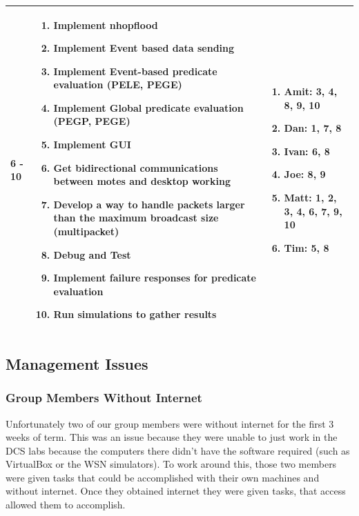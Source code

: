 \begin{center}
\begin{longtable}{| l | p{7.5cm} | p{5cm} |}
	6 - 10 & \begin{enumerate}
		\item Implement nhopflood
		\item Implement Event based data sending
		\item Implement Event-based predicate evaluation (PELE, PEGE)
		\item Implement Global predicate evaluation (PEGP, PEGE)
		\item Implement GUI
		\item Get bidirectional communications between motes and desktop working
		\item Develop a way to handle packets larger than the maximum broadcast size (multipacket)
		\item Debug and Test
		\item Implement failure responses for predicate evaluation
		\item Run simulations to gather results
		\end{enumerate} &
	\begin{enumerate}
		\item[] Amit: 3, 4, 8, 9, 10
		\item[] Dan: 1, 7, 8
		\item[] Ivan: 6, 8
		\item[] Joe: 8, 9
		\item[] Matt: 1, 2, 3, 4, 6, 7, 9, 10
		\item[] Tim: 5, 8
	\end{enumerate}
	\\ \hline
	
	\end{longtable}
\end{center}



\subsection{Management Issues}

\subsubsection{Group Members Without Internet}
Unfortunately two of our group members were without internet for the first 3 weeks of term. This was an issue because they were unable to just work in the DCS labs because the computers there didn't have the software required (such as VirtualBox or the WSN simulators). To work around this, those two members were given tasks that could be accomplished with their own machines and without internet. Once they obtained internet they were given tasks, that access allowed them to accomplish.


